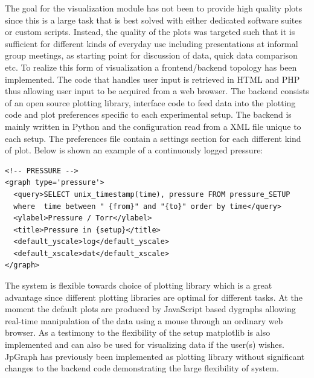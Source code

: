 The goal for the visualization module has not been to provide high quality
plots since this is a large task that is best solved with either dedicated
software suites or custom scripts. Instead, the quality of the plots was
targeted such that it is sufficient for different kinds of everyday use
including presentations at informal group meetings, as starting point for
discussion of data, quick data comparison etc. To realize this form of
visualization a frontend/backend topology has been implemented. The code that
handles user input is retrieved in HTML and PHP thus allowing user input to be
acquired from a web browser. The backend consists of an open source plotting
library, interface code to feed data into the plotting code and plot
preferences specific to each experimental setup. The backend is mainly written
in Python and the configuration read from a XML file unique to each setup. The
preferences file contain a settings section for each different kind of plot.
Below is shown an example of a continuously logged pressure:

\begin{verbatim} 
<!-- PRESSURE --> 
<graph type='pressure'>
  <query>SELECT unix_timestamp(time), pressure FROM pressure_SETUP
  where  time between " {from}" and "{to}" order by time</query>
  <ylabel>Pressure / Torr</ylabel>
  <title>Pressure in {setup}</title>
  <default_yscale>log</default_yscale>
  <default_xscale>dat</default_xscale>
</graph>
\end{verbatim}

The system is flexible towards choice of plotting library which is a great
advantage since different plotting libraries are optimal for different tasks.
At the moment the default plots are produced by JavaScript based
dygraphs\cite{dygraphs} allowing real-time manipulation of the data using a
mouse through an ordinary web browser. As a testimony to the flexibility of the
setup matplotlib\cite{matplotlib} is also implemented and can also be used for
visualizing data if the user(s) wishes. JpGraph\cite{jpgraph} has previously
been implemented as plotting library without significant changes to the backend
code demonstrating the large flexibility of system.
